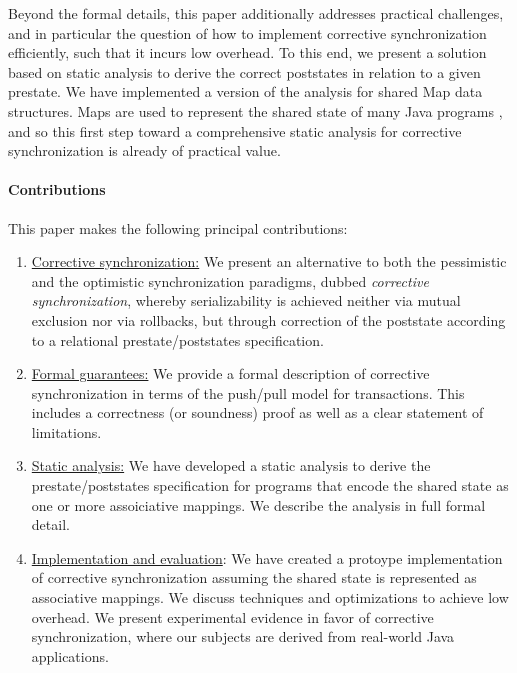 Beyond the formal details, this paper additionally addresses practical challenges, and in particular the question of how to implement corrective synchronization efficiently, such that it incurs low overhead. To this end, we present a solution based on static analysis to derive the correct poststates in relation to a given prestate. We have implemented a version of the analysis for shared {\sf Map} data structures. {\sf Map}s are used to represent the shared state of many Java programs \cite{XXX}, and so this first step toward a comprehensive static analysis for corrective synchronization is already of practical value.

\paragraph{Contributions} This paper makes the following principal contributions:
\begin{enumerate}
	\item \underline{Corrective synchronization:} We present an alternative to both the pessimistic and the optimistic synchronization paradigms, dubbed \emph{corrective synchronization}, whereby serializability is achieved neither via mutual exclusion nor via rollbacks, but through correction of the poststate according to a relational prestate/poststates specification.
	\item \underline{Formal guarantees:} We provide a formal description of corrective synchronization in terms of the push/pull model for transactions. This includes a correctness (or soundness) proof as well as a clear statement of limitations.
	\item \underline{Static analysis:} We have developed a static analysis to derive the prestate/poststates specification for programs that encode the shared state as one or more assoiciative mappings. We describe the analysis in full formal detail.
	\item \underline{Implementation and evaluation}: We have created a protoype implementation of corrective synchronization assuming the shared state is represented as associative mappings. We discuss techniques and optimizations to achieve low overhead. We present experimental evidence in favor of corrective synchronization, where our subjects are derived from real-world Java applications.
\end{enumerate}